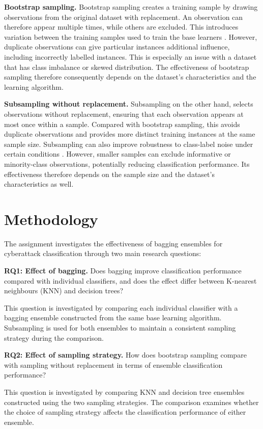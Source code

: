 \documentclass[conference, 10pt]{IEEEtran}
\begin{document}
\textbf{Bootstrap sampling.} Bootstrap sampling creates a training sample by drawing observations from the original dataset with 
replacement. An observation can therefore appear multiple times, while others are excluded. This introduces variation between the 
training samples used to train the base learners \cite{DBLP:journals/ml/Breiman96b}. However, duplicate observations can give 
particular instances additional influence, including incorrectly labelled instances. This is especially an issue with a dataset 
that has class imbalance or skewed distribution. The effectiveness of bootstrap sampling therefore consequently depends on the dataset's 
characteristics and the learning algorithm.

\textbf{Subsampling without replacement.} Subsampling on the other hand, selects observations without replacement, ensuring that each 
observation appears at most once within a sample. Compared with bootstrap sampling, this avoids duplicate observations and provides more 
distinct training instances at the same sample size. Subsampling can also improve robustness to class-label noise under certain conditions 
\cite{sabzevari2018two}. However, smaller samples can exclude informative or minority-class observations, potentially reducing classification 
performance. Its effectiveness therefore depends on the sample size and the dataset's characteristics as well.

\section{Methodology}

The assignment investigates the effectiveness of bagging ensembles for cyberattack classification through two main research questions:

\textbf{RQ1: Effect of bagging.} Does bagging improve classification performance compared with individual classifiers, and does the effect 
differ between K-nearest neighbours (KNN) and decision trees?

This question is investigated by comparing each individual classifier with a bagging ensemble constructed from the same base learning algorithm. 
Subsampling is used for both ensembles to maintain a consistent sampling strategy during the comparison.

\textbf{RQ2: Effect of sampling strategy.} How does bootstrap sampling compare with sampling without replacement in terms of ensemble 
classification performance?

This question is investigated by comparing KNN and decision tree ensembles constructed using the two sampling strategies. 
The comparison examines whether the choice of sampling strategy affects the classification performance of either ensemble.
\end{document}
